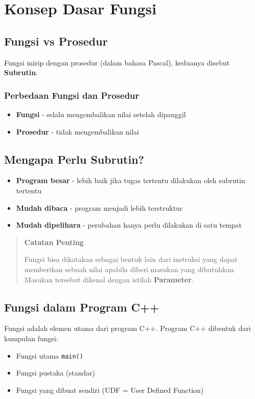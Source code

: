 \section{Konsep Dasar Fungsi}\label{konsep-dasar-fungsi}

\subsection{Fungsi vs Prosedur}

Fungsi mirip dengan prosedur (dalam bahasa Pascal), keduanya disebut \textbf{Subrutin}.

\subsubsection{Perbedaan Fungsi dan Prosedur}

\begin{itemize}
\item \textbf{Fungsi} - selalu mengembalikan nilai setelah dipanggil
\item \textbf{Prosedur} - tidak mengembalikan nilai
\end{itemize}

\subsection{Mengapa Perlu Subrutin?}

\begin{itemize}
\item \textbf{Program besar} - lebih baik jika tugas tertentu dilakukan oleh subrutin tertentu
\item \textbf{Mudah dibaca} - program menjadi lebih terstruktur
\item \textbf{Mudah dipelihara} - perubahan hanya perlu dilakukan di satu tempat
\end{itemize}
\begin{quotation}
{\LARGE {}} \textbf{Catatan Penting}

Fungsi bisa dikatakan sebagai bentuk lain dari instruksi yang dapat memberikan sebuah nilai apabila diberi masukan yang dibutuhkan. Masukan tersebut dikenal dengan istilah \textbf{Parameter}.
\end{quotation}


\subsection{Fungsi dalam Program C++}

Fungsi adalah elemen utama dari program C++. Program C++ dibentuk dari kumpulan fungsi:
\begin{itemize}
\item Fungsi utama \texttt{main()}
\item Fungsi pustaka (standar)
\item Fungsi yang dibuat sendiri (UDF = User Defined Function)
\end{itemize}

